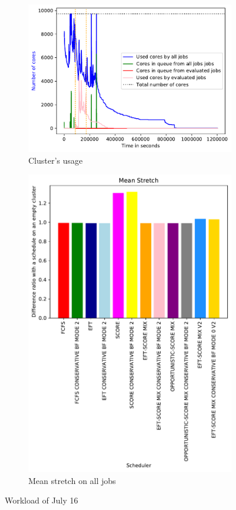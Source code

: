 \documentclass[a4paper]{article}
\begin{document}
\begin{figure}[H]\centering
\begin{subfigure}[b]{0.4\linewidth}\centering\includegraphics[width=1\linewidth]{MBSS/plot/2022-07-16->2022-07-16_V9271_Fcfs_Used_nodes_450_128_32_256_4_1024.pdf}\caption{Cluster's usage}\end{subfigure}
\begin{subfigure}[b]{0.4\linewidth}\centering\includegraphics[width=0.9\linewidth]{MBSS/plot/Results_FCFS_Score_Backfill_2022-07-16->2022-07-16_V9271_Mean_Stretch_450_128_32_256_4_1024.pdf}\caption{Mean stretch on all jobs}\end{subfigure}
\caption{Workload of July 16}\end{figure}
\end{document}
